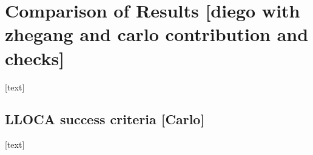 \section{Comparison of Results [diego with zhegang and carlo contribution and checks]}
\label{sec:introduction}

[text]

\subsection{LLOCA success criteria [Carlo]}

[text]